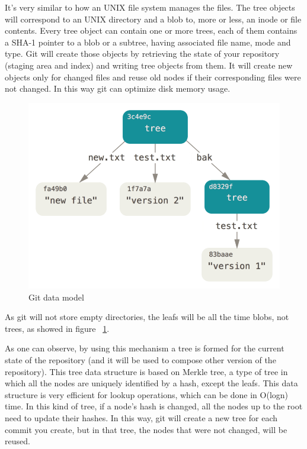         It's very similar to how an UNIX file system manages the files. The tree objects will correspond to an UNIX directory and a blob to, more or less, an inode or file contents. Every tree object can contain one or more trees, each of them contains a SHA-1 pointer to a blob or a subtree, having associated file name, mode and type. Git will create those objects by retrieving the state of your repository (staging area and index) and writing tree objects from them. It will create new objects only for changed files and reuse old nodes if their corresponding files were not changed. In this way git can optimize disk memory usage.

        \begin{figure}[h]
           \begin{center}
               \includegraphics[width=\textwidth]{theoretical/data-model-2.png}
            \end{center}
            \caption{\label{fig:gitobjects} Git data model \cite{GOBJ}}
        \end{figure}

        As git will not store empty directories, the leafs will be all the time blobs, not trees, as showed in figure ~\ref{fig:gitobjects}.

        As one can observe, by using this mechanism a tree is formed for the current state of the repository (and it will be used to compose other version of the repository). This tree data structure is based on Merkle tree, a type of tree in which all the nodes are uniquely identified by a hash, except the leafs. This data structure is very efficient for lookup operations, which can be done in O(logn) time. In this kind of tree, if a node's hash is changed, all the nodes up to the root need to update their hashes. In this way, git will create a new tree for each commit you create, but in that tree, the nodes that were not changed, will be reused.

